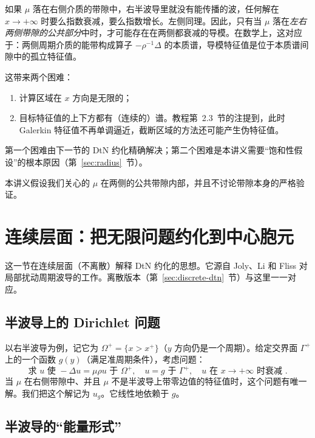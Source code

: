\documentclass[11pt,a4paper,fontset=fandol]{ctexart}
\begin{document}
如果 $\mu$ 落在右侧介质的带隙中，右半波导里就没有能传播的波，任何解在 $x\to+\infty$ 时要么指数衰减，要么指数增长。左侧同理。因此，只有当 $\mu$ 落在\emph{左右两侧带隙的公共部分}中时，才可能存在在两侧都衰减的导模。在数学上，这对应于：两侧周期介质的能带构成算子 $-\rho^{-1}\Delta$ 的本质谱，导模特征值是位于本质谱间隙中的孤立特征值。

这带来两个困难：
\begin{enumerate}
\item 计算区域在 $x$ 方向是无限的；
\item 目标特征值的上下方都有（连续的）谱。教程第~2.3~节的注提到，此时 Galerkin 特征值不再单调逼近，截断区域的方法还可能产生伪特征值\citep{CancesEhrlacherMaday2014}。
\end{enumerate}
第一个困难由下一节的 DtN 约化精确解决；第二个困难是本讲义需要“饱和性假设”的根本原因（第~\ref{sec:radius}~节）。

本讲义假设我们关心的 $\mu$ 在两侧的公共带隙内部，并且不讨论带隙本身的严格验证。

\section{连续层面：把无限问题约化到中心胞元}
\label{sec:continuous-dtn}

这一节在连续层面（不离散）解释 DtN 约化的思想。它源自 Joly、Li 和 Fliss 对局部扰动周期波导的工作\citep{JolyLiFliss2006,Fliss2013}。离散版本（第~\ref{sec:discrete-dtn}~节）与这里一一对应。

\subsection{半波导上的 Dirichlet 问题}

以右半波导为例，记它为 $\Omega^+=\{x>x^+\}$（$y$ 方向仍是一个周期）。给定交界面 $\Gamma^+$ 上的一个函数 $g(y)$（满足准周期条件），考虑问题：
\begin{equation}
\label{eq:half-dirichlet}
\text{求 }u\text{ 使 }-\Delta u=\mu\rho u\text{ 于 }\Omega^+,\quad u=g\text{ 于 }\Gamma^+,\quad u\text{ 在 }x\to+\infty\text{ 时衰减 .}
\end{equation}
当 $\mu$ 在右侧带隙中、并且 $\mu$ 不是半波导上带零边值的特征值时，这个问题有唯一解\citep{Fliss2013}。我们把这个解记为 $u_g$。它线性地依赖于 $g$。

\subsection{半波导的“能量形式”}
\end{document}
